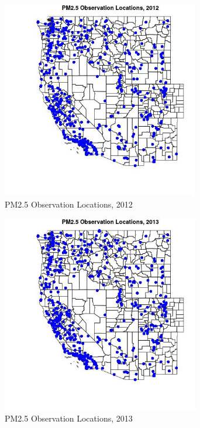 \begin{figure} 
\centering  
\includegraphics[width=0.77\textwidth]{Code_Outputs/Report_PM25_Step4_part_e_de_duplicated_aves_prioritize_24hr_obs_ML_input_PlotLoc2012.jpg} 
\caption{\label{fig:Report_PM25_Step4_part_e_de_duplicated_aves_prioritize_24hr_obs_ML_inputPlotLoc2012}PM2.5 Observation Locations, 2012} 
\end{figure} 
 

\begin{figure} 
\centering  
\includegraphics[width=0.77\textwidth]{Code_Outputs/Report_PM25_Step4_part_e_de_duplicated_aves_prioritize_24hr_obs_ML_input_PlotLoc2013.jpg} 
\caption{\label{fig:Report_PM25_Step4_part_e_de_duplicated_aves_prioritize_24hr_obs_ML_inputPlotLoc2013}PM2.5 Observation Locations, 2013} 
\end{figure} 
 

